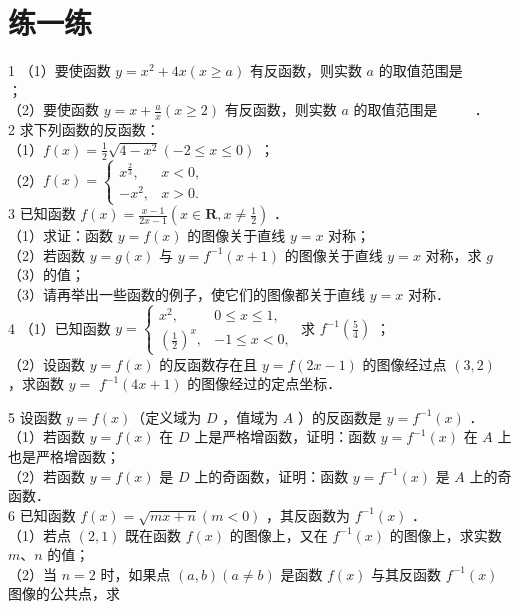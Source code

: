 \documentclass[10pt]{article}
\begin{document}
\section*{练一练}
1 （1）要使函数 \(y=x^{2}+4 x(x \geqslant a)\) 有反函数，则实数 \(a\) 的取值范围是 \(\qquad\) ；\\
（2）要使函数 \(y=x+\frac{a}{x}(x \geqslant 2)\) 有反函数，则实数 \(a\) 的取值范围是 \(\qquad\) ．\\
2 求下列函数的反函数：\\
（1）\(f(x)=\frac{1}{2} \sqrt{4-x^{2}}(-2 \leqslant x \leqslant 0)\) ；\\
（2）\(f(x)= \begin{cases}x^{\frac{2}{3}}, & x<0, \\ -x^{2}, & x>0 .\end{cases}\)\\
3 已知函数 \(f(x)=\frac{x-1}{2 x-1}\left(x \in \mathbf{R}, x \neq \frac{1}{2}\right)\) ．\\
（1）求证：函数 \(y=f(x)\) 的图像关于直线 \(y=x\) 对称；\\
（2）若函数 \(y=g(x)\) 与 \(y=f^{-1}(x+1)\) 的图像关于直线 \(y=x\) 对称，求 \(g\)（3）的值；\\
（3）请再举出一些函数的例子，使它们的图像都关于直线 \(y=x\) 对称．\\
4 （1）已知函数 \(y=\left\{\begin{array}{ll}x^{2}, & 0 \leqslant x \leqslant 1, \\ \left(\frac{1}{2}\right)^{x}, & -1 \leqslant x<0,\end{array}\right.\) 求 \(f^{-1}\left(\frac{5}{4}\right)\) ；\\
（2）设函数 \(y=f(x)\) 的反函数存在且 \(y=f(2 x-1)\) 的图像经过点 \((3,2)\) ，求函数 \(y=\) \(f^{-1}(4 x+1)\) 的图像经过的定点坐标．

5 设函数 \(y=f(x)\)（定义域为 \(D\) ，值域为 \(A\) ）的反函数是 \(y=f^{-1}(x)\) ．\\
（1）若函数 \(y=f(x)\) 在 \(D\) 上是严格增函数，证明：函数 \(y=f^{-1}(x)\) 在 \(A\) 上也是严格增函数；\\
（2）若函数 \(y=f(x)\) 是 \(D\) 上的奇函数，证明：函数 \(y=f^{-1}(x)\) 是 \(A\) 上的奇函数．\\
6 已知函数 \(f(x)=\sqrt{m x+n}(m<0)\) ，其反函数为 \(f^{-1}(x)\) ．\\
（1）若点 \((2,1)\) 既在函数 \(f(x)\) 的图像上，又在 \(f^{-1}(x)\) 的图像上，求实数 \(m 、 n\) 的值；\\
（2）当 \(n=2\) 时，如果点 \((a, b)(a \neq b)\) 是函数 \(f(x)\) 与其反函数 \(f^{-1}(x)\) 图像的公共点，求
\end{document}
